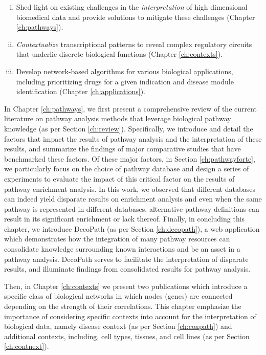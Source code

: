 \begin{enumerate}[i.]

  \item Shed light on existing challenges in the \textit{interpretation} of high dimensional biomedical data and provide solutions to mitigate these challenges (Chapter \ref{ch:pathways}).
  
  \item \textit{Contextualize} transcriptional patterns to reveal complex regulatory circuits that underlie discrete biological functions (Chapter \ref{ch:contexts}).
  
  \item Develop network-based algorithms for various biological applications, including prioritizing drugs for a given indication and disease module identification (Chapter \ref{ch:applications}).

\end{enumerate}

\noindent
In Chapter \ref{ch:pathways}, we first present a comprehensive review of the current literature on pathway analysis methods that leverage biological pathway knowledge (as per Section \ref{ch:review}). Specifically, we introduce and detail the factors that impact the results of pathway analysis and the interpretation of these results, and summarize the findings of major comparative studies that have benchmarked these factors. Of these major factors, in Section \ref{ch:pathwayforte}, we particularly focus on the choice of pathway database and design a series of experiments to evaluate the impact of this critical factor on the results of pathway enrichment analysis. In this work, we observed that different databases can indeed yield disparate results on enrichment analysis and even when the same pathway is represented in different databases, alternative pathway definitions can result in its significant enrichment or lack thereof. Finally, in concluding this chapter, we introduce DecoPath (as per Section \ref{ch:decopath}), a web application which demonstrates how the integration of many pathway resources can consolidate knowledge surrounding known interactions and be an asset in a pathway analysis. DecoPath serves to facilitate the interpretation of disparate results, and illuminate findings from consolidated results for pathway analysis. 

Then, in Chapter \ref{ch:contexts} we present two publications which introduce a specific class of biological networks in which nodes (genes) are connected depending on the strength of their correlations. This chapter emphasize the importance of considering specific contexts into account for the interpretation of biological data, namely disease context (as per Section \ref{ch:coxpath}) and additional contexts, including, cell types, tissues, and cell lines (as per Section \ref{ch:contnext}). 


